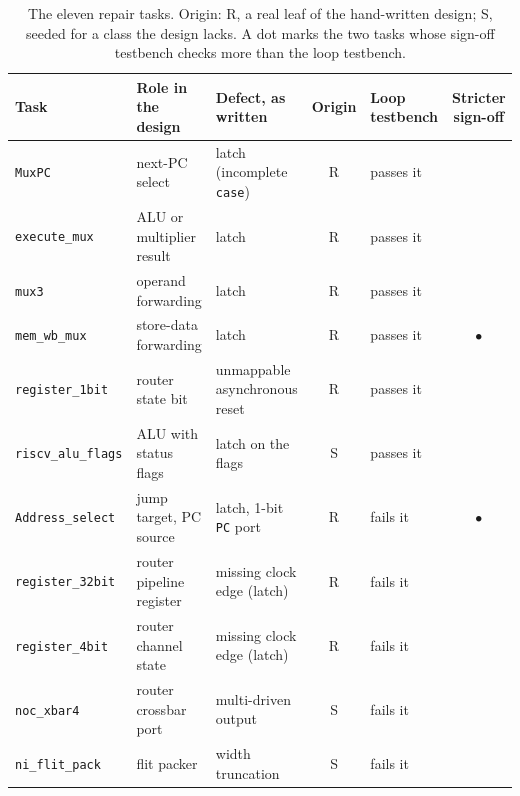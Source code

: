 \documentclass[11pt]{article}
\begin{document}
\begin{table}[!htbp]
\centering
\footnotesize
\caption{The eleven repair tasks. Origin: R, a real leaf of the hand-written
design; S, seeded for a class the design lacks. A dot marks the two tasks
whose sign-off testbench checks more than the loop testbench.}
\label{tab:tasks}
\begin{tabular}{@{}l l l c l c@{}}
\toprule
Task & Role in the design & Defect, as written & Origin & Loop testbench & \makecell{Stricter\\sign-off} \\
\midrule
\texttt{MuxPC}            & next-PC select           & latch (incomplete \texttt{case}) & R & passes it & \\
\texttt{execute\_mux}     & ALU or multiplier result & latch                            & R & passes it & \\
\texttt{mux3}             & operand forwarding       & latch                            & R & passes it & \\
\texttt{mem\_wb\_mux}     & store-data forwarding    & latch                            & R & passes it & $\bullet$ \\
\texttt{register\_1bit}   & router state bit         & unmappable asynchronous reset    & R & passes it & \\
\texttt{riscv\_alu\_flags}& ALU with status flags    & latch on the flags               & S & passes it & \\
\addlinespace
\texttt{Address\_select}  & jump target, PC source   & latch, 1-bit \texttt{PC} port    & R & fails it  & $\bullet$ \\
\texttt{register\_32bit}  & router pipeline register & missing clock edge (latch)       & R & fails it  & \\
\texttt{register\_4bit}   & router channel state     & missing clock edge (latch)       & R & fails it  & \\
\texttt{noc\_xbar4}       & router crossbar port     & multi-driven output              & S & fails it  & \\
\texttt{ni\_flit\_pack}   & flit packer              & width truncation                 & S & fails it  & \\
\bottomrule
\end{tabular}
\end{table}
\end{document}
